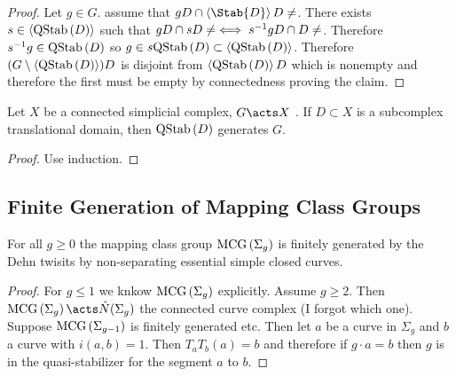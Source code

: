 \documentclass[12pt]{extarticle}
\begin{document}
\begin{proof}
Let $g \in G$. assume that $g D \cap \left< \Stab{D} \right> D \neq \empty$. There exists $s \in \left< \mathrm{QStab}\left( D \right) \right> $ such that $g D \cap s D \neq \empty \iff s^{-1} g D \cap D \neq \empty$. Therefore $s^{-1} g \in \mathrm{QStab}\left( D \right)$ so $g \in s \mathrm{QStab}\left( D \right) \subset \left< \mathrm{QStab}\left( D \right) \right>$. Therefore $(G \setminus \left< \mathrm{QStab}\left( D \right) \right>)D$ is disjoint from $\left< \mathrm{QStab}\left( D \right) \right> D$ which is nonempty and therefore the first must be empty by connectedness proving the claim.
\end{proof}

\begin{thm}
Let $X$ be a connected simplicial complex, $G \acts X$ . If $D \subset X$ is a subcomplex translational domain, then $\mathrm{QStab}\left( D \right)$ generates $G$.
\end{thm}

\begin{proof}
Use induction.
\end{proof}

\subsection{Finite Generation of Mapping Class Groups}

\begin{thm}
For all $g \ge 0$ the mapping class group $\mathrm{MCG}\left( \Sigma_g \right)$ is finitely generated by the Dehn twisits by non-separating essential simple closed curves.
\end{thm}

\begin{proof}
For $g \le 1$ we knkow $\mathrm{MCG}\left( \Sigma_g \right)$ explicitly. Assume $g \ge 2$. Then $\MCG{\Sigma_g} \acts \hat{N}(\Sigma_g)$ the connected curve complex (I forgot which one). Suppose $\mathrm{MCG}\left( \Sigma_{g-1} \right)$ is finitely generated etc. Then let $a$ be a curve in $\Sigma_g$ and $b$ a curve with $i(a,b) = 1$. Then $T_a T_b(a) = b$ and therefore if $g \cdot a = b$ then $g$ is in the quasi-stabilizer for the segment $a$ to $b$. 
\end{proof}
\end{document}
